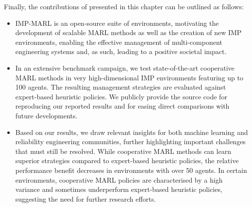 Finally, the contributions of \citep{leroy2023impmarl} presented in this chapter can be outlined as follows:
\begin{itemize}
  \item IMP-MARL is an open-source suite of environments, motivating the development of scalable MARL methods as well as the creation of new IMP environments, enabling the effective management of multi-component engineering systems and, as such, leading to a positive societal impact.
  \item In an extensive benchmark campaign, we test state-of-the-art cooperative MARL methods in very high-dimensional IMP environments featuring up to 100 agents.
  The resulting management strategies are evaluated against expert-based heuristic policies.
  We publicly provide the source code for reproducing our reported results and for easing direct comparisons with future developments.
  \item Based on our results, we draw relevant insights for both machine learning and reliability engineering communities, further highlighting important challenges that must still be resolved.
  While cooperative MARL methods can learn superior strategies compared to expert-based heuristic policies, the relative performance benefit decreases in environments with over 50 agents.
  In certain environments, cooperative MARL policies are characterised by a high variance and sometimes underperform expert-based heuristic policies, suggesting the need for further research efforts.
\end{itemize}



